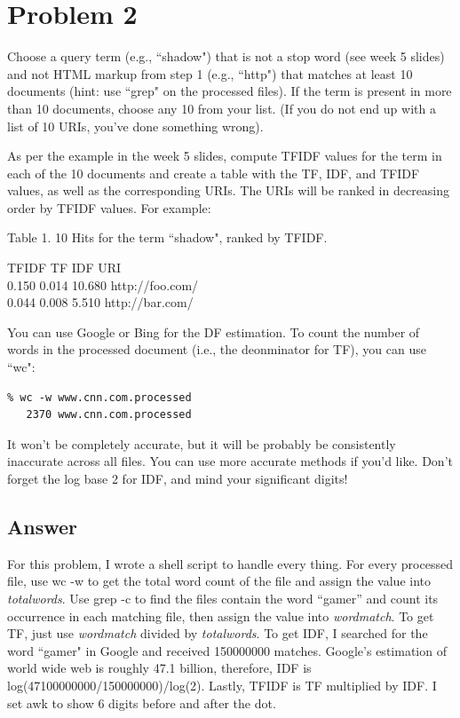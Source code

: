 \documentclass[12pt]{article}
\begin{document}
\section*{Problem 2}
Choose a query term (e.g., ``shadow") that is not a stop word
(see week 5 slides) and not HTML markup from step 1 (e.g., ``http")
that matches at least 10 documents (hint: use ``grep" on the processed
files).  If the term is present in more than 10 documents, choose
any 10 from your list.  (If you do not end up with a list of 10
URIs, you've done something wrong).

As per the example in the week 5 slides, compute TFIDF values for
the term in each of the 10 documents and create a table with the
TF, IDF, and TFIDF values, as well as the corresponding URIs.  The
URIs will be ranked in decreasing order by TFIDF values.  For
example:

\noindent
Table 1. 10 Hits for the term ``shadow", ranked by TFIDF.

\noindent
TFIDF	TF	 IDF 	URI\\
0.150	0.014	10.680	http://foo.com/\\
0.044	0.008	 5.510	http://bar.com/

You can use Google or Bing for the DF estimation.  To count the
number of words in the processed document (i.e., the deonminator
for TF), you can use ``wc":

\begin{verbatim}
% wc -w www.cnn.com.processed
   2370 www.cnn.com.processed
\end{verbatim}

It won't be completely accurate, but it will be probably be
consistently inaccurate across all files.  You can use more 
accurate methods if you'd like. Don't forget the log base 2 for IDF, and mind your significant digits!
     
\subsection*{Answer}

For this problem, I wrote a shell script to handle every thing. For every processed file, use wc -w to get the total word count of the file and assign the value into \textit{totalwords}. Use grep -c to find the files contain the word ``gamer'' and count its occurrence in each matching file, then assign the value into \textit{wordmatch}. To get TF, just use \textit{wordmatch} divided by \textit{totalwords}. To get IDF, I searched for the word ``gamer" in Google and received 150000000 matches. Google's estimation of world wide web is roughly 47.1 billion, therefore, IDF is log(47100000000/150000000)/log(2). Lastly, TFIDF is TF multiplied by IDF. I set awk to show 6 digits before and after the dot.
\end{document}
